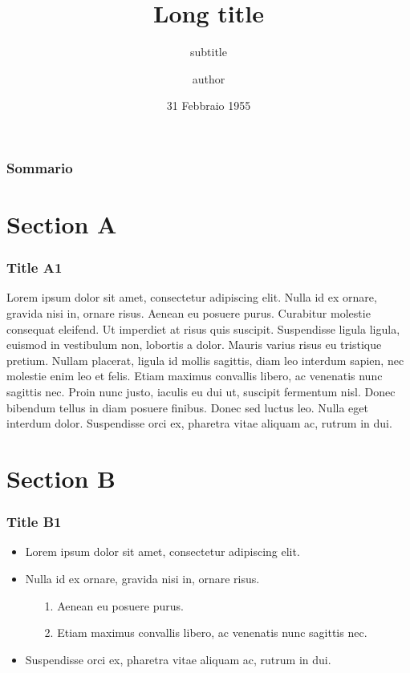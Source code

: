 \documentclass[c]{beamer}
\title[Short title]{Long title}
\subtitle{subtitle}
\author[author]{author}
\date[31/04/1995]{31 Febbraio 1955}
\begin{document}

\polimititlepage %
\polimititlepage[polimi]
\polimititlepage[airlab]

\addtocounter{framenumber}{-3}


\begin{frame}
\frametitle{Sommario}
\tableofcontents
\end{frame}

\section{Section A}

\begin{frame}
\frametitle{Title A1}

Lorem ipsum dolor sit amet, consectetur adipiscing elit. Nulla id ex ornare, gravida nisi in, ornare risus. Aenean eu posuere purus. Curabitur molestie consequat eleifend. Ut imperdiet at risus quis suscipit. Suspendisse ligula ligula, euismod in vestibulum non, lobortis a dolor. Mauris varius risus eu tristique pretium. Nullam placerat, ligula id mollis sagittis, diam leo interdum sapien, nec molestie enim leo et felis. Etiam maximus convallis libero, ac venenatis nunc sagittis nec. Proin nunc justo, iaculis eu dui ut, suscipit fermentum nisl. Donec bibendum tellus in diam posuere finibus. Donec sed luctus leo. Nulla eget interdum dolor. Suspendisse orci ex, pharetra vitae aliquam ac, rutrum in dui.

\end{frame}

\section{Section B}

\begin{frame}
\frametitle{Title B1}

\begin{itemize}
\addtolength{\itemsep}{.2cm}
\item Lorem ipsum dolor sit amet, consectetur adipiscing elit.
\item Nulla id ex ornare, gravida nisi in, ornare risus.
  \begin{itemize}
    \addtolength{\itemsep}{.1cm}
  \item[1.] Aenean eu posuere purus.
  \item[2.] Etiam maximus convallis libero, ac venenatis nunc sagittis nec.
  \end{itemize}
\item Suspendisse orci ex, pharetra vitae aliquam ac, rutrum in dui.
\end{itemize}

\end{frame}
\end{document}
